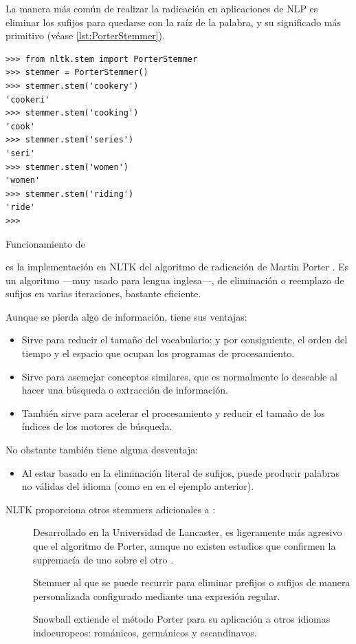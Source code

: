 La manera más común de realizar la radicación en aplicaciones de NLP es eliminar los sufijos para quedarse con la raíz de la palabra, y su significado más primitivo (véase \autoref{lst:PorterStemmer}).

\begin{listing}[htbp]
\begin{verbatim}
>>> from nltk.stem import PorterStemmer
>>> stemmer = PorterStemmer()
>>> stemmer.stem('cookery')
'cookeri'
>>> stemmer.stem('cooking')
'cook'
>>> stemmer.stem('series')
'seri'
>>> stemmer.stem('women')
'women'
>>> stemmer.stem('riding')
'ride'
>>> 
\end{verbatim}
\caption{Funcionamiento de }
\label{lst:PorterStemmer}
\end{listing}

 es la implementación en NLTK del algoritmo de radicación de Martin Porter \citep{Porter1980}. Es un algoritmo ---muy usado para lengua inglesa---, de eliminación o reemplazo de sufijos en varias iteraciones, bastante eficiente.

Aunque se pierda algo de información, tiene sus ventajas:
\nopagebreak
\begin{itemize}
\item Sirve para reducir el tamaño del vocabulario; y por consiguiente, el orden del tiempo y el espacio que ocupan los programas de procesamiento.
\item Sirve para asemejar conceptos similares, que es normalmente lo deseable al hacer una búsqueda o extracción de información.
\item También sirve para acelerar el procesamiento y reducir el tamaño de los índices de los motores de búsqueda.
\end{itemize}

No obstante también tiene alguna desventaja:
\nopagebreak
\begin{itemize}
\item Al estar basado en la eliminación literal de sufijos, puede producir palabras no válidas del idioma (como en  en el ejemplo anterior).
\end{itemize}

NLTK proporciona otros stemmers adicionales a :
\begin{description}
\item[] Desarrollado en la Universidad de Lancaster, es ligeramente más agresivo que el algoritmo de Porter, aunque no existen estudios que confirmen la supremacía de uno sobre el otro \citep{Perkins2014}.
\item[] Stemmer al que se puede recurrir para eliminar prefijos o sufijos de manera personalizada configurado mediante una expresión regular.
\item[] Snowball extiende el método Porter para su aplicación a otros idiomas indoeuropeos: románicos, germánicos y escandinavos.
\end{description}

